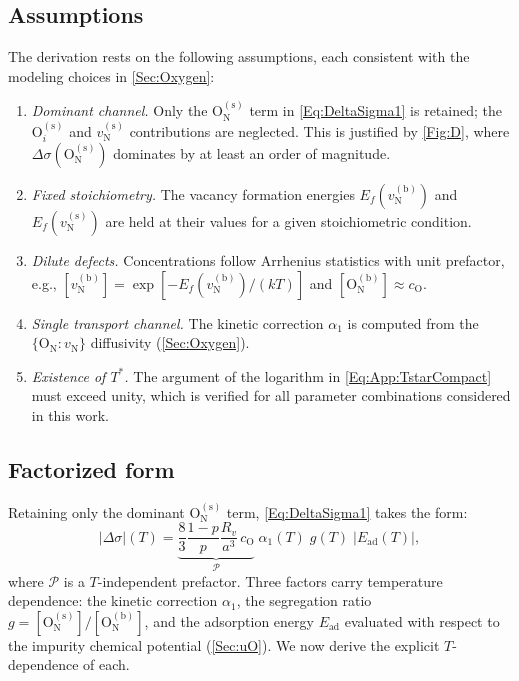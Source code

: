 \documentclass[preprint,12pt,sort&compress]{elsarticle}
\newcommand{\?}{\stackrel{?}{=}}
\begin{document}
\subsection{Assumptions}
\label{App:Tpeak:Assumptions}

The derivation rests on the following assumptions, each consistent with the modeling choices in \cref{Sec:Oxygen}:
\begin{enumerate}[label=(\roman*)]
    \item \textit{Dominant channel.} Only the $\text{O}_\text{N}^{(\text{s})}$ term in \cref{Eq:DeltaSigma1} is retained; the $\text{O}_i^{(\text{s})}$ and $v_\text{N}^{(\text{s})}$ contributions are neglected. This is justified by \cref{Fig:D}, where $\Delta \sigma(\text{O}_\text{N}^{(\text{s})})$ dominates by at least an order of magnitude.
    \item \textit{Fixed stoichiometry.} The vacancy formation energies $E_f(v_\text{N}^{(\text{b})})$ and $E_f(v_\text{N}^{(\text{s})})$ are held at their values for a given stoichiometric condition.
    \item \textit{Dilute defects.} Concentrations follow Arrhenius statistics with unit prefactor, e.g., $[v_\text{N}^{(\text{b})}] = \exp[-E_f(v_\text{N}^{(\text{b})})/(kT)]$ and $[\text{O}_\text{N}^{(\text{b})}] \approx c_\text{O}$.
    \item \textit{Single transport channel.} The kinetic correction $\alpha_1$ is computed from the $\{\text{O}_\text{N} : v_\text{N}\}$ diffusivity (\cref{Sec:Oxygen}).
    \item \textit{Existence of $T^*$.} The argument of the logarithm in \cref{Eq:App:TstarCompact} must exceed unity, which is verified for all parameter combinations considered in this work.
\end{enumerate}

\subsection{Factorized form}
\label{App:Tpeak:Factorization}

Retaining only the dominant $\text{O}_\text{N}^{(\text{s})}$ term, \cref{Eq:DeltaSigma1} takes the form:
\begin{equation}
|\Delta \sigma|(T) = \underbrace{\frac{8}{3}\frac{1-p}{p}\frac{R_v}{a^3}\,c_\text{O}}_{\displaystyle\mathcal{P}}\;\alpha_1(T)\;g(T)\;|E_\text{ad}(T)|,
\label{Eq:App:Factorization}
\end{equation}
where $\mathcal{P}$ is a $T$-independent prefactor. Three factors carry temperature dependence: the kinetic correction $\alpha_1$, the segregation ratio $g = [\text{O}_\text{N}^{(\text{s})}]/[\text{O}_\text{N}^{(\text{b})}]$, and the adsorption energy $E_\text{ad}$ evaluated with respect to the impurity chemical potential (\cref{Sec:uO}). We now derive the explicit $T$-dependence of each.
\end{document}
